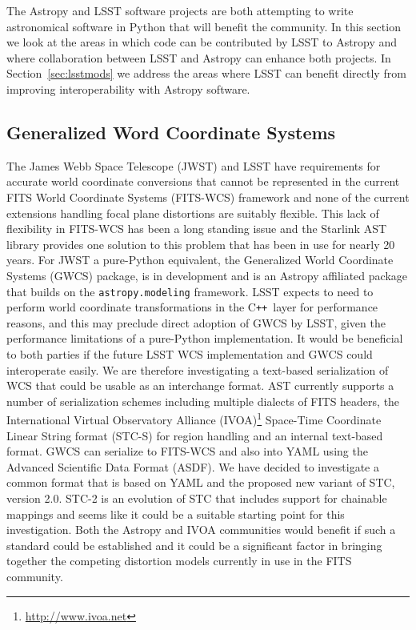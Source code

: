 \documentclass[]{spie}  %
\newcommand{\CPP}{C\texttt{++}\xspace}  %
\begin{document}
The Astropy and LSST software projects are both attempting to write astronomical software in Python that will benefit the community.
In this section we look at the areas in which code can be contributed by LSST to Astropy and where collaboration between LSST and Astropy can enhance both projects.
In Section~\ref{sec:lsstmods} we address the areas where LSST can benefit directly from improving interoperability with Astropy software.

\subsection{Generalized Word Coordinate Systems}

The James Webb Space Telescope (JWST)\cite{2006SSRv..123..485G} and LSST have requirements for accurate world coordinate conversions that cannot be represented in the current FITS World Coordinate Systems (FITS-WCS) framework\cite{2013ASPC..475...49H,2002A&A...395.1077C,2015A&C....12..133T} and none of the current extensions handling focal plane distortions\cite{2012SPIE.8451E..1MS,2012tpv} are suitably flexible.
This lack of flexibility in FITS-WCS has been a long standing issue and the Starlink AST library\cite{Berry201633} provides one solution to this problem that has been in use for nearly 20 years.
For JWST a pure-Python equivalent, the Generalized World Coordinate Systems (GWCS) package, is in development\cite{2016_P028_adassxxv} and is an Astropy affiliated package that builds on the \texttt{astropy.modeling} framework.
LSST expects to need to perform world coordinate transformations in the \CPP\ layer for performance reasons, and this may preclude direct adoption of GWCS by LSST, given the performance limitations of a pure-Python implementation.
It would be beneficial to both parties if the future LSST WCS implementation and GWCS could interoperate easily.
We are therefore investigating a text-based serialization of WCS that could be usable as an interchange format.
AST currently supports a number of serialization schemes including multiple dialects of FITS headers, the International Virtual Observatory Alliance (IVOA)\footnote{\url{http://www.ivoa.net}} Space-Time Coordinate Linear String format (STC-S)\cite{2007ivoa.spec.1030R} for region handling\cite{2010ASPC..434..213B} and an internal text-based format.
GWCS can serialize to FITS-WCS and also into YAML\cite{2009yaml} using the Advanced Scientific Data Format (ASDF)\cite{2015A&C....12..240G}.
We have decided to investigate a common format that is based on YAML and the proposed new variant of STC, version 2.0.
STC-2\cite{2015ivoaSTC2} is an evolution of STC that includes support for chainable mappings and seems like it could be a suitable starting point for this investigation.
Both the Astropy and IVOA communities would benefit if such a standard could be established and it could be a significant factor in bringing together the competing distortion models currently in use in the FITS community.
\end{document}
